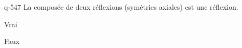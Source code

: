 \begin{truefalse}{q-547}
La composée de deux réflexions (symétries axiales) est une réflexion.
\item Vrai
\item* Faux
\end{truefalse}

